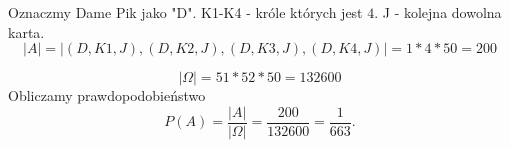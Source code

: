 \medskip
{}
\medskip

Oznaczmy Dame Pik jako "D".
K1-K4 - króle których jest $4$.
J - kolejna dowolna karta.
$$
|A|= |{(D,K1,J), (D,K2,J), (D,K3,J), (D,K4,J)}| = 1 * 4 * 50 = 200
$$

$$
|\Omega| = 51*52*50 = 132600
$$
Obliczamy prawdopodobieństwo
$$
P(A)=\frac{|A|}{|\Omega|}=\frac{200}{132600}=\frac{1}{663}.
$$
